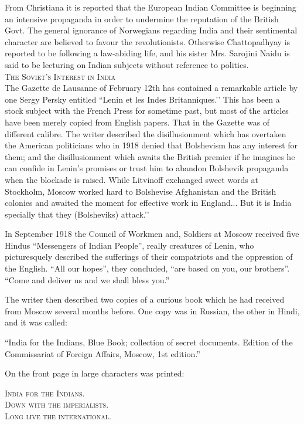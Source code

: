 From Christiana it is reported that the European Indian Committee is beginning an intensive propaganda in order to undermine the reputation of the British Govt. The general ignorance of Norwegians regarding India and their sentimental character are believed to favour the revolutionists. Otherwise Chattopadhyay is reported to be following a law-abiding life, and his sister Mrs. Sarojini Naidu is said to be lecturing on Indian subjects without reference to politics. \\

\textsc{The Soviet’s Interest in India}\\

The Gazette de Lausanne of February 12th has contained a remarkable article by one Sergy Persky entitled “Lenin et les Indes Britanniques.’’ This has been a stock subject with the French Press for sometime past, but most of the articles have been merely copied from English papers. That in the Gazette was of different calibre. The writer described the disillusionment which has overtaken the American politicians who in 1918 denied that Bolshevism has any interest for them; and the disillusionment which awaits the British premier if he imagines he can confide in Lenin’s promises or trust him to abandon Bolshevik propaganda when the blockade is raised. While Litvinoff exchanged sweet words at Stockholm, Moscow worked hard to Bolshevise Afghanistan and the British colonies and awaited the moment for effective work in England... But it is India specially that they (Bolsheviks) attack.’’ 

In September 1918 the Council of Workmen and, Soldiers at Moscow received five Hindus “Messengers of Indian People”, really creatures of Lenin, who picturesquely described the sufferings of their compatriots and the oppression of the English. “All our hopes”, they concluded, “are based on you, our brothers”. “Come and deliver us and we shall bless you.” 

The writer then described two copies of a curious book which he had received from Moscow several months before. One copy was in Russian, the other in Hindi, and it was called: 

“India for the Indians, Blue Book; collection of secret documents. Edition of the Commissariat of Foreign Affairs, Moscow, 1st edition.” 

On the front page in large characters was printed: 
\begin{center}
\textsc{India for the Indians.} \\
\textsc{Down with the imperialists.} \\
\textsc{Long live the international.}\\
\end{center}

